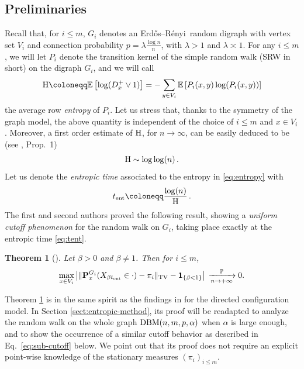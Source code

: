 \documentclass[11pt,oneside]{amsart}
\numberwithin{equation}{section}  %
\theoremstyle{plain}
\newtheorem{theorem}{Theorem}
\newcommand{\er}{Erdős–Rényi~}
\newcommand{\E}{\mathbb{E}}
\newcommand{\p}{\mathbb{P}}
\newcommand{\one}{\textup{\textbf{1}}}
\newcommand{\pconv}{\xrightarrow[n \to +\infty]{\quad \p \quad}}
\newcommand{\tent}{t_{\textup{ent}}}
\newcommand{\quench}{\mathbf{P}}
\newcommand{\entropy}{\textup{H}}
\begin{document}
\subsection{Preliminaries}\label{suse:preliminaries}
Recall that, for $i \le m$, $G_i$ denotes an \er random digraph with 
vertex set $V_i$ and connection probability $p= \lambda \frac{\log n}{n}$, with $\lambda>1$ and $\lambda\asymp1$. 
For any $i\le m$, we will let $P_i$ denote the transition kernel of the simple random walk (SRW in short) on the digraph $G_i$, and we will call 
\begin{equation}\label{eq:entropy}
	\entropy\coloneqq \E\left[\log (D_x^+\vee 1)\right] = -\sum_{y\in V_i} \E\left[P_i(x,y) \log (P_i(x,y))\right]
\end{equation} the average row \emph{entropy} of $P_i$. Let us stress that, thanks to the symmetry of the graph model, the above quantity is independent of the choice of $i\le m$ and $x\in V_i$. Moreover, a first order estimate of $\entropy$, for $n\to\infty$, can be easily deduced to be (see \cite{BP}, Prop.~1)
\begin{equation}
	\entropy\sim{\log \log(n)}\,.
\end{equation}
Let us denote the \emph{entropic time} associated to the entropy in \eqref{eq:entropy} with
\begin{equation}\label{eq:tent}
	\tent  \coloneqq \frac{\log(n)}{\entropy}\,.
\end{equation}
%
The first and second authors proved the following result, showing a \emph{uniform cutoff phenomenon} for the random walk on $G_i$, taking place exactly at the entropic time \eqref{eq:tent}.
\newcommand{\Tup}{T}
%
\begin{theorem}[\cite{BP}] \label{thm:cutoff}
	Let $\beta>0$ and $\beta\neq 1$. Then for $i \le m$,
	\begin{equation}
		\max_{x \in V_i}
		\big|\|\quench^{G_i}_x(X_{\beta\tent}\in \cdot)-\pi_i\|_{\rm TV}-\one_{\{\beta<1\}}\big|\,
		\pconv0.
	\end{equation}
\end{theorem}
Theorem \ref{thm:cutoff} is in the same spirit as the findings in \cite{BCS1,CCPQ} for the directed configuration model.
In Section \ref{sect:entropic-method}, its proof
will be readapted to analyze the random walk on the whole graph ${\rm DBM}(n,m,p,\alpha)$ when $\alpha$ is large enough, and to show the occurrence of a similar cutoff behavior as described in Eq.~\eqref{eq:sub-cutoff} below.
 We point out that its proof does not require an explicit point-wise knowledge of the stationary measures $(\pi_i)_{i \le m}$. 
\end{document}
